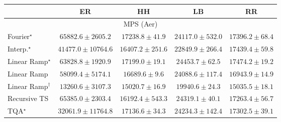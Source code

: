 \begin{tabular}{l|cccc|}
\toprule
            & ER & HH & LB & RR \\
\midrule
\multicolumn{5}{c}{\rule{0pt}{8pt}MPS (Aer)} \\
\midrule
Fourier$^\star$ & {\cellcolor[HTML]{85288D}} \color[HTML]{F1F1F1} $65882.6\pm 2605.2$ & {\cellcolor[HTML]{C8DAEA}} \color[HTML]{000000} $17238.8\pm 41.9$ & {\cellcolor[HTML]{B1C9E1}} \color[HTML]{000000} $24117.0\pm 532.0$ & {\cellcolor[HTML]{C7D9E9}} \color[HTML]{000000} $17396.2\pm 68.4$ \\
Interp.$^\star$ & {\cellcolor[HTML]{8C91C4}} \color[HTML]{F1F1F1} $41477.0\pm 10764.6$ & {\cellcolor[HTML]{CBDCEB}} \color[HTML]{000000} $16407.2\pm 251.6$ & {\cellcolor[HTML]{B5CCE3}} \color[HTML]{000000} $22849.9\pm 266.4$ & {\cellcolor[HTML]{C7D9E9}} \color[HTML]{000000} $17439.4\pm 59.8$ \\
Linear Ramp$^\star$ & {\cellcolor[HTML]{863293}} \color[HTML]{F1F1F1} $63828.8\pm 1920.9$ & {\cellcolor[HTML]{C8DAEA}} \color[HTML]{000000} $17199.0\pm 19.1$ & {\cellcolor[HTML]{B0C9E1}} \color[HTML]{000000} $24453.7\pm 62.5$ & {\cellcolor[HTML]{C7D9E9}} \color[HTML]{000000} $17474.2\pm 19.2$ \\
Linear Ramp & {\cellcolor[HTML]{894CA2}} \color[HTML]{F1F1F1} $58099.4\pm 5174.1$ & {\cellcolor[HTML]{CADBEB}} \color[HTML]{000000} $16689.6\pm 9.6$ & {\cellcolor[HTML]{B2CAE1}} \color[HTML]{000000} $24088.6\pm 117.4$ & {\cellcolor[HTML]{C9DBEA}} \color[HTML]{000000} $16943.9\pm 14.9$ \\
Linear Ramp$^\dagger$ & {\cellcolor[HTML]{D4E3EF}} \color[HTML]{000000} $13260.6\pm 3107.3$ & {\cellcolor[HTML]{CFDFED}} \color[HTML]{000000} $15020.7\pm 16.9$ & {\cellcolor[HTML]{BFD3E6}} \color[HTML]{000000} $19940.6\pm 24.3$ & {\cellcolor[HTML]{CFDFED}} \color[HTML]{000000} $15035.5\pm 18.1$ \\
Recursive TS & {\cellcolor[HTML]{852A8E}} \color[HTML]{F1F1F1} $65385.0\pm 2303.4$ & {\cellcolor[HTML]{CBDCEB}} \color[HTML]{000000} $16192.4\pm 543.3$ & {\cellcolor[HTML]{B1C9E1}} \color[HTML]{000000} $24319.1\pm 40.1$ & {\cellcolor[HTML]{C8DAEA}} \color[HTML]{000000} $17263.4\pm 56.7$ \\
TQA$^\star$ & {\cellcolor[HTML]{9BB6D7}} \color[HTML]{000000} $32061.9\pm 11764.8$ & {\cellcolor[HTML]{C8DAEA}} \color[HTML]{000000} $17136.6\pm 34.3$ & {\cellcolor[HTML]{B1C9E1}} \color[HTML]{000000} $24234.3\pm 142.4$ & {\cellcolor[HTML]{C8DAEA}} \color[HTML]{000000} $17302.5\pm 39.1$ \\

\end{tabular}
